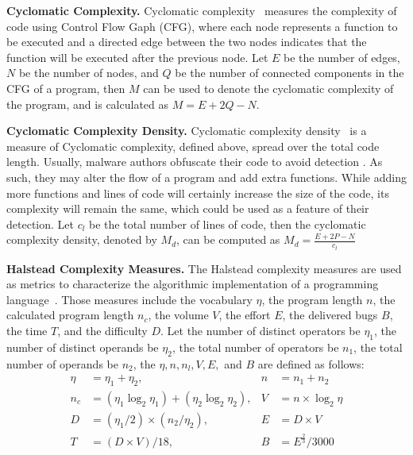 \documentclass[acmlarge]{acmart}
\newcommand{\BfPara}[1]{{\noindent\bf#1.}\xspace\xspace}
\newcommand{\vs}[1]{{\vspace{-#1mm}}}
\begin{document}
\BfPara{Cyclomatic Complexity} Cyclomatic complexity~\cite{McCabe76,WatsonMW96} measures the complexity of code  using Control Flow Gaph (CFG), where each node represents a function to be executed and a directed edge between the two nodes indicates that the function will be executed after the previous node. Let $E$ be the number of edges, $N$ be the number of nodes, and $Q$ be the number of connected components in the CFG of a program, then $M$ can be used to denote the cyclomatic complexity of the program, and is calculated as $M = E + 2Q - N$.  







\BfPara{Cyclomatic Complexity Density} Cyclomatic complexity density~\cite{FentonN99} is a measure of Cyclomatic complexity, defined above, spread over the total code length. Usually, malware authors obfuscate their code to avoid detection \cite{Galeano17}. As such, they may alter the flow of a program and add extra functions. While adding more functions and lines of code will certainly increase the size of the code, its complexity will remain the same, which could be used as a feature of their detection. Let $c_l$ be the total number of lines of code, then the cyclomatic complexity density, denoted by $M_d$, can be computed as $M_d = \frac{E + 2P - N}{c_l}$

\BfPara{Halstead Complexity Measures} The Halstead complexity measures are used as metrics to characterize the algorithmic implementation of a programming language~\cite{Serebrenik11}. Those measures include the vocabulary $\eta$, the program length $n$, the calculated program length $n_c$, the volume $V$, the effort $E$, the delivered bugs $B$, the time $T$, and the difficulty $D$. Let the number of distinct operators be $\eta _{1}$, the number of distinct operands be $\eta _{2}$, the total number of operators be $n_1$, the total number of operands be $n_2$, the $\eta, n, n_l, V, E,$ and $B$ are defined as follows:
\vs{0}
\begin{align}\label{equation:halsted} 
    \nonumber\eta &= \eta _{1}+ \eta _{2},  & n &= n_{1}+n_{2}\\
    \nonumber n_c &= (\eta _{1}\log _{2}\eta _{1})+(\eta _{2}\log _{2}\eta _{2}), & V &= n\times \log _{2}\eta\\
    \nonumber D &= (\eta _{1}/ 2)\times (n_{2} / \eta _{2}), & E &= D\times V\\
    \nonumber T &= {(D \times V)}/{18}, & B &= {E^{\frac{2}{3}}}/{3000} 
\end{align}
\end{document}
